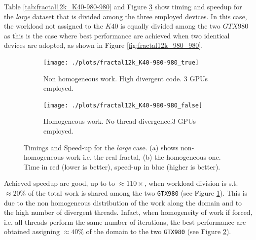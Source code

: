 Table \ref{tab:fractal12k_K40-980-980} and Figure \ref{fig:fractal12k_K40-980-980} show timing and speedup for the \textit{large} dataset that is divided among the three employed devices. In this case, the workload not assigned to the $K40$ is equally divided among the two $GTX980$ as this is the case where best performance are achieved when two identical devices are adopted, as shown in  Figure \ref{fig:fractal12k_980_980}.
\begin{figure}
	\begin{subfigure}{1.0\textwidth}
		\caption{Non homogeneous work. High divergent code. $3$ GPUs employed.}
		\texttt{[image: ./plots/fractal12k\_K40-980-980\_true]}
				\label{fig:fractal12k_K40-980-980_true}
	\end{subfigure}		
	\endminipage \hfill
	\vspace{5mm}
	\begin{subfigure}{1.0\textwidth}
				\texttt{[image: ./plots/fractal12k\_K40-980-980\_false]}
		\caption{Homogeneous work. No thread divergence.$3$ GPUs employed. }
		\label{fig:fractal12k_K40-980-980_false}
	\end{subfigure}
	\endminipage\hfill
\caption{Timings and Speed-up for the \textit{large} case. (a) shows non-homogeneous work i.e. the real fractal, (b) the homogeneous one. Time in red (lower is better), speed-up in blue (higher is better).}
	\label{fig:fractal12k_K40-980-980}
\end{figure}
Achieved speedup are good, up to to $\approx 110 \times$, when workload division is s.t. $\approx 20\%$ of the total work is shared among the two \texttt{GTX980} (see Figure \ref{fig:fractal12k_K40-980-980_true}). 
This is due to the non homogeneous distribution of the work along the domain and to the high number of divergent threads. Infact, when homogeneity of work if forced, i.e. all threads perform the same number of iterations, the best performance are obtained assigning $\approx 40\%$  of the domain  to the two \texttt{GTX980} (see Figure \ref{fig:fractal12k_K40-980-980_false}).

